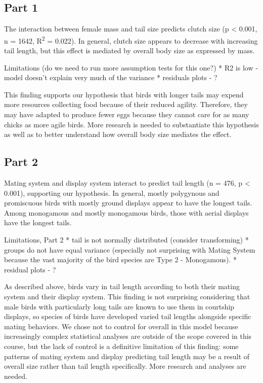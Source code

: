 \documentclass[
  12pt,
]{article}
\begin{document}
\hypertarget{part-1}{%
\subsection{Part 1}\label{part-1}}

The interaction between female mass and tail size predicts clutch size
(p \textless{} 0.001, n = 1642, R\textsuperscript{2} = 0.022). In
general, clutch size appears to decrease with increasing tail length,
but this effect is mediated by overall body size as expressed by mass.

Limitations (do we need to run more assumption tests for this one?) * R2
is low - model doesn't explain very much of the variance * residuals
plots - ?

This finding supports our hypothesis that birds with longer tails may
expend more resources collecting food because of their reduced agility.
Therefore, they may have adapted to produce fewer eggs because they
cannot care for as many chicks as more agile birds. More research is
needed to substantiate this hypothesis as well as to better understand
how overall body size mediates the effect.

\hypertarget{part-2}{%
\subsection{Part 2}\label{part-2}}

Mating system and display system interact to predict tail length (n =
476, p \textless{} 0.001), supporting our hypothesis. In general, mostly
polygynous and promiscuous birds with mostly ground displays appear to
have the longest tails. Among monogamous and mostly monogamous birds,
those with aerial displays have the longest tails.

Limitations, Part 2 * tail is not normally distributed (consider
transforming) * groups do not have equal variance (especially not
surprising with Mating System because the vast majority of the bird
species are Type 2 - Monogamous). * residual plots - ?

As described above, birds vary in tail length according to both their
mating system and their display system. This finding is not surprising
considering that male birds with particularly long tails are known to
use them in courtship displays, so species of birds have developed
varied tail lengths alongside specific mating behaviors. We chose not to
control for overall in this model because increasingly complex
statistical analyses are outside of the scope covered in this course,
but the lack of control is a definitive limitation of this finding: some
patterns of mating system and display predicting tail length may be a
result of overall size rather than tail length specifically. More
research and analyses are needed.
\end{document}
